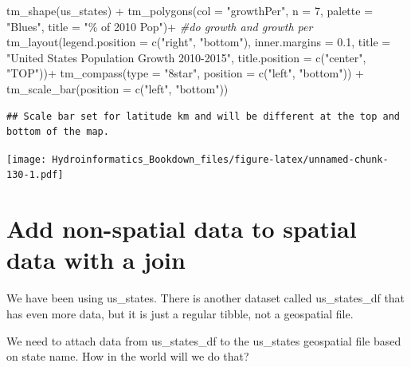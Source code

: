 \documentclass[
]{book}
\newenvironment{Shaded}{\begin{snugshade}}{\end{snugshade}}
\newcommand{\AttributeTok}[1]{\textcolor[rgb]{0.77,0.63,0.00}{#1}}
\newcommand{\CommentTok}[1]{\textcolor[rgb]{0.56,0.35,0.01}{\textit{#1}}}
\newcommand{\DecValTok}[1]{\textcolor[rgb]{0.00,0.00,0.81}{#1}}
\newcommand{\FloatTok}[1]{\textcolor[rgb]{0.00,0.00,0.81}{#1}}
\newcommand{\FunctionTok}[1]{\textcolor[rgb]{0.00,0.00,0.00}{#1}}
\newcommand{\NormalTok}[1]{#1}
\newcommand{\SpecialCharTok}[1]{\textcolor[rgb]{0.00,0.00,0.00}{#1}}
\newcommand{\StringTok}[1]{\textcolor[rgb]{0.31,0.60,0.02}{#1}}
\begin{document}
\begin{Shaded}
\begin{Highlighting}[]
\FunctionTok{tm\_shape}\NormalTok{(us\_states) }\SpecialCharTok{+} 
  \FunctionTok{tm\_polygons}\NormalTok{(}\AttributeTok{col =} \StringTok{"growthPer"}\NormalTok{, }\AttributeTok{n =} \DecValTok{7}\NormalTok{, }
              \AttributeTok{palette =} \StringTok{"Blues"}\NormalTok{, }\AttributeTok{title =} \StringTok{"\% of 2010 Pop"}\NormalTok{)}\SpecialCharTok{+} \CommentTok{\#do growth and growth per}
  \FunctionTok{tm\_layout}\NormalTok{(}\AttributeTok{legend.position =} \FunctionTok{c}\NormalTok{(}\StringTok{"right"}\NormalTok{, }\StringTok{"bottom"}\NormalTok{), }
            \AttributeTok{inner.margins =} \FloatTok{0.1}\NormalTok{,}
            \AttributeTok{title =} \StringTok{"United States Population Growth 2010{-}2015"}\NormalTok{, }
            \AttributeTok{title.position =} \FunctionTok{c}\NormalTok{(}\StringTok{"center"}\NormalTok{, }\StringTok{"TOP"}\NormalTok{))}\SpecialCharTok{+}
  \FunctionTok{tm\_compass}\NormalTok{(}\AttributeTok{type =} \StringTok{"8star"}\NormalTok{, }\AttributeTok{position =} \FunctionTok{c}\NormalTok{(}\StringTok{"left"}\NormalTok{, }\StringTok{"bottom"}\NormalTok{)) }\SpecialCharTok{+}
  \FunctionTok{tm\_scale\_bar}\NormalTok{(}\AttributeTok{position =} \FunctionTok{c}\NormalTok{(}\StringTok{"left"}\NormalTok{, }\StringTok{"bottom"}\NormalTok{))}
\end{Highlighting}
\end{Shaded}

\begin{verbatim}
## Scale bar set for latitude km and will be different at the top and bottom of the map.
\end{verbatim}

\texttt{[image: Hydroinformatics\_Bookdown\_files/figure-latex/unnamed-chunk-130-1.pdf]}

\hypertarget{add-non-spatial-data-to-spatial-data-with-a-join}{%
\section{Add non-spatial data to spatial data with a join}\label{add-non-spatial-data-to-spatial-data-with-a-join}}

We have been using us\_states. There is another dataset called us\_states\_df that has even more data, but it is just a regular tibble, not a geospatial file.

We need to attach data from us\_states\_df to the us\_states geospatial file based on state name. How in the world will we do that?
\end{document}
